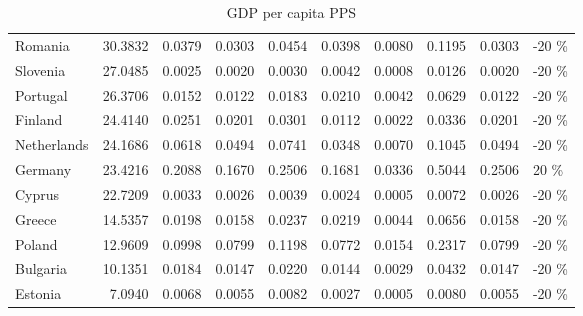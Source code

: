 \documentclass[a4paper,twoside,10pt]{article}
\begin{document}
\begin{table}[H]
\begin{tabular}{lrrrrrrrrl}
	\rowcolor[rgb]{0.8,0.8,1}	Romania & 30.3832 & 0.0379 &\cellcolor[rgb]{0.9,0.9,0.9} 0.0303 & 0.0454 & 0.0398 & 0.0080 & 0.1195 & 0.0303 & -20 \% \\ 
	\rowcolor[rgb]{0.8,1,0.8}	 Slovenia & 27.0485 & 0.0025 &\cellcolor[rgb]{0.9,0.9,0.9} 0.0020 & 0.0030 & 0.0042 & 0.0008 & 0.0126 & 0.0020 & -20 \% \\ 
	\rowcolor[rgb]{0.8,1,0.8}	 Portugal & 26.3706 & 0.0152 &\cellcolor[rgb]{0.9,0.9,0.9} 0.0122 & 0.0183 & 0.0210 & 0.0042 & 0.0629 & 0.0122 & -20 \% \\ 
	\rowcolor[rgb]{0.8,1,0.8}	 Finland & 24.4140 & 0.0251 &\cellcolor[rgb]{0.9,0.9,0.9} 0.0201 & 0.0301 & 0.0112 & 0.0022 & 0.0336 & 0.0201 & -20 \% \\ 
	\rowcolor[rgb]{0.8,1,0.8}	Netherlands & 24.1686 & 0.0618 &\cellcolor[rgb]{0.9,0.9,0.9} 0.0494 & 0.0741 & 0.0348 & 0.0070 & 0.1045 & 0.0494 & -20 \% \\ 
	\rowcolor[rgb]{1,0.8,0.8}	Germany & 23.4216 & 0.2088 & 0.1670 &\cellcolor[rgb]{0.9,0.9,0.9} 0.2506 & 0.1681 & 0.0336 & 0.5044 & 0.2506 & 20 \% \\ 
	\rowcolor[rgb]{0.8,1,0.8}	 Cyprus & 22.7209 & 0.0033 &\cellcolor[rgb]{0.9,0.9,0.9} 0.0026 & 0.0039 & 0.0024 & 0.0005 & 0.0072 & 0.0026 & -20 \% \\ 
	\rowcolor[rgb]{0.8,1,0.8}	 Greece & 14.5357 & 0.0198 &\cellcolor[rgb]{0.9,0.9,0.9} 0.0158 & 0.0237 & 0.0219 & 0.0044 & 0.0656 & 0.0158 & -20 \% \\ 
		\rowcolor[rgb]{1,0.8,0.8} Poland & 12.9609 & 0.0998 &\cellcolor[rgb]{0.9,0.9,0.9} 0.0799 & 0.1198 & 0.0772 & 0.0154 & 0.2317 & 0.0799 & -20 \% \\ 
	\rowcolor[rgb]{0.8,0.8,1}	 Bulgaria & 10.1351 & 0.0184 &\cellcolor[rgb]{0.9,0.9,0.9} 0.0147 & 0.0220 & 0.0144 & 0.0029 & 0.0432 & 0.0147 & -20 \% \\ 
	\rowcolor[rgb]{0.8,0.8,1}	 Estonia & 7.0940 & 0.0068 &\cellcolor[rgb]{0.9,0.9,0.9} 0.0055 & 0.0082 & 0.0027 & 0.0005 & 0.0080 & 0.0055 & -20 \% \\ 
		\hline
	\end{tabular}
	\caption{GDP per capita PPS} 

\end{table}
\end{document}
